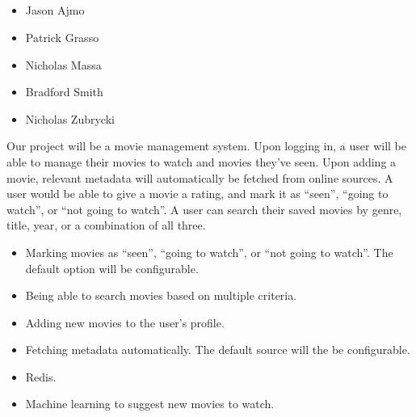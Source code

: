 \documentclass[11pt, letterpaper]{article}
\begin{document}
\\
\\
\noindent{\today}\\
\\


\begin{itemize}
    \item[\textbullet]Jason Ajmo
    \item[\textbullet]Patrick Grasso
    \item[\textbullet]Nicholas Massa
    \item[\textbullet]Bradford Smith
    \item[\textbullet]Nicholas Zubrycki
\end{itemize}



\bigskip

Our project will be a movie management system. Upon logging in, a user will be able to manage their movies to watch and movies they've seen. Upon adding a movie, relevant metadata will automatically be fetched from online sources. A user would be able to give a movie a rating, and mark it as ``seen'', ``going to watch'', or ``not going to watch''. A user can search their saved movies by genre, title, year, or a combination of all three.

\bigskip


\begin{itemize}
    \item[\textbullet]Marking movies as ``seen'', ``going to watch'', or ``not going to watch''. The default option will be configurable.
    \item[\textbullet]Being able to search movies based on multiple criteria.
    \item[\textbullet]Adding new movies to the user's profile.
    \item[\textbullet]Fetching metadata automatically. The default source will the be configurable.
\end{itemize}


\begin{itemize}
    \item[\textbullet]Redis.
    \item[\textbullet]Machine learning to suggest new movies to watch.
\end{itemize}
\end{document}
